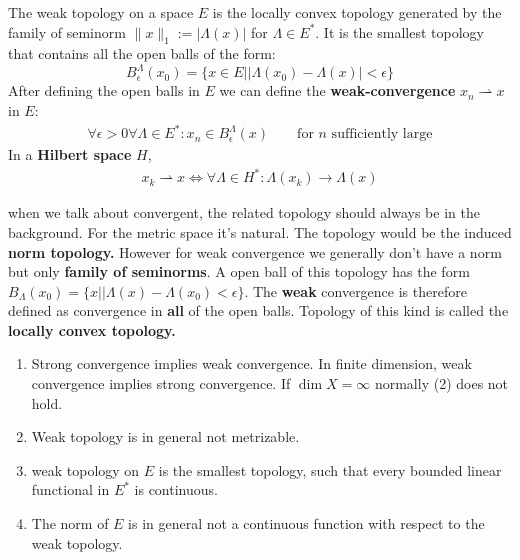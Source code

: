 \begin{definition}
	 The weak topology on a space $E$ is the locally convex topology generated by the family of seminorm $\|x\|_1 := |\Lambda(x)|$ for $\Lambda \in E^*$. It is the smallest topology that contains all the open balls of the form:
	 \begin{equation*}
	 	B_\epsilon^\Lambda (x_0) = \{x \in E | |\Lambda(x_0) - \Lambda(x)| < \epsilon \}
	 \end{equation*}
	 After defining the open balls in $E$ we can define the \textbf{weak-convergence} $ x_n \rightharpoonup x$ in $E$:
	 \begin{align*}
	 	\forall \epsilon > 0 \forall \Lambda \in E^*: 
	 	x_n \in B^\Lambda_\epsilon(x) \qquad \text{for $n$ sufficiently large}
	 \end{align*} 
	In a \textbf{Hilbert space} $H$, 
	\begin{align*}
		x_k \rightharpoonup x \Leftrightarrow \forall \Lambda \in H^*: \Lambda(x_k) \rightarrow \Lambda(x)
	\end{align*}
\end{definition}
\begin{remark}
when we talk about convergent, the related topology should always be in the background. For 	the metric space it's natural. The topology would be the induced \textbf{norm topology.} However for weak convergence we generally don't have a norm but only \textbf{family of seminorms}. A open ball of this topology has the form $B_\Lambda(x_0) = \{x | |\Lambda(x) - \Lambda(x_0) < \epsilon\}$. The \textbf{weak} convergence is therefore defined as convergence in \textbf{all} of the open balls. Topology of this kind is called the \textbf{locally convex topology.}
\end{remark}

\begin{example}	
\end{example}

\begin{remark}\quad
\begin{enumerate}
	\item Strong  convergence implies weak convergence. In finite dimension, weak convergence implies strong convergence. If $\dim X = \infty$ normally (2) does not hold.
	\item Weak topology is in general not metrizable.
	\item weak topology on $E$ is the smallest topology, such that every bounded linear functional in $E^*$ is continuous.
	\item The norm of $E$ is in general not a continuous function with respect to the weak topology. 
\end{enumerate}
\end{remark}


